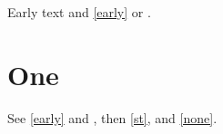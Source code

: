 \documentclass{article}
\newcounter{step}
\begin{document}
Early text\label{early} and \cref{early} or .
\section{One}
See \cref{early} and , then \label{st}\cref{st},  and \cref{none}.
\end{document}
